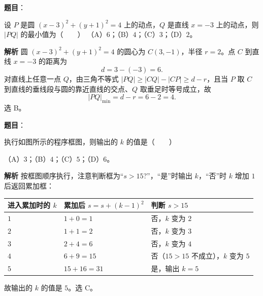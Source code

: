\begin{answer}

\textbf{题目}：

设 $P$ 是圆 $(x-3)^2+(y+1)^2=4$ 上的动点，$Q$ 是直线 $x=-3$ 上的动点，则 $|PQ|$ 的最小值为\mbox{（　　）}
（A）$6$；（B）$4$；（C）$3$；（D）$2$。

\textbf{解析}
圆 $(x-3)^2+(y+1)^2=4$ 的圆心为 $C(3,-1)$，半径 $r=2$。点 $C$ 到直线 $x=-3$ 的距离为
\nopagebreak[4]
\[d=3-(-3)=6.\]
对直线上任意一点 $Q$，由三角不等式 $|PQ|\geqslant|CQ|-|CP|\geqslant d-r$，且当 $P$ 取 $C$ 到直线的垂线段与圆的靠近直线的交点、$Q$ 取垂足时等号成立，故
\nopagebreak[4]
\[|PQ|_{\min}=d-r=6-2=4.\]
选 B。


\end{answer}
\begin{answer}

\textbf{题目}：

执行如图所示的程序框图，则输出的 $k$ 的值是\mbox{（　　）}
\nopagebreak[4]
\begin{center}\end{center}
\nopagebreak[4]
（A）$3$；（B）$4$；（C）$5$；（D）$6$。

\textbf{解析}
按框图顺序执行，注意判断框为“$s>15$?”，“是”时输出 $k$，“否”时 $k$ 增加 $1$ 后返回累加框：
\begin{center}
\begin{tabular}{lll}
\toprule
进入累加时的 $k$ & 累加后 $s=s+(k-1)^2$ & 判断 $s>15$ \\
\midrule
$1$ & $1+0=1$ & 否，$k$ 变为 $2$ \\
$2$ & $1+1=2$ & 否，$k$ 变为 $3$ \\
$3$ & $2+4=6$ & 否，$k$ 变为 $4$ \\
$4$ & $6+9=15$ & 否（$15>15$ 不成立），$k$ 变为 $5$ \\
$5$ & $15+16=31$ & 是，输出 $k=5$ \\
\bottomrule
\end{tabular}
\end{center}

故输出的 $k$ 的值是 $5$。选 C。


\end{answer}
